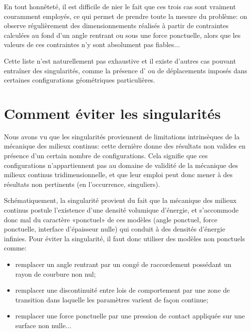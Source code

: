 \medskip
En tout honnêteté, il est difficile de nier le fait que ces trois cas sont vraiment couramment employés, ce qui permet de prendre toute la mesure du problème: on observe régulièrement des dimensionnements réalisés à partir de contraintes calculées au fond d'un angle rentrant ou sous une force ponctuelle, alors que les valeurs de ces contraintes n'y sont absolument pas fiables...

Cette liste n'est naturellement pas exhaustive et il existe d'autres cas pouvant entraîner des singularités, comme la présence d' ou de déplacements imposés dans certaines configurations géométriques particulières. 


\medskip
\section{Comment éviter les singularités}

Nous avons vu que les singularités proviennent de limitations intrinsèques de la mécanique des milieux continus: cette dernière donne des résultats non valides en présence d'un certain nombre de configurations. Cela signifie que ces configurations n'appartiennent pas au domaine de validité de la mécanique des milieux continus tridimensionnelle, et que leur emploi peut donc mener à des résultats non pertinents (en l'occurrence, singuliers).

\medskip
Schématiquement, la singularité provient du fait que la mécanique des milieux continus postule l'existence d'une densité volumique d'énergie, et s'accommode donc mal du caractère «ponctuel» de ces modèles (angle ponctuel, force ponctuelle, interface d'épaisseur nulle) qui conduit à des densités d'énergie infinies. Pour éviter la singularité, il faut donc utiliser des modèles non ponctuels comme:
\begin{itemize}
  \item remplacer un angle rentrant par un congé de raccordement possédant un rayon de courbure non nul;
  \item remplacer une discontinuité entre lois de comportement par une zone de transition dans laquelle les paramètres varient de façon continue;
  \item remplacer une force ponctuelle par une pression de contact appliquée sur une surface non nulle...
\end{itemize}

